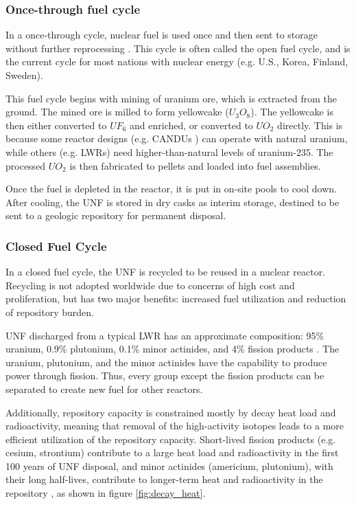 \subsubsection{Once-through fuel cycle}

In a once-through cycle, nuclear fuel is used once and then sent to
storage without further reprocessing \cite{tsoulfanidis_nuclear_2013}.
This cycle is often called the open fuel cycle, and is the current cycle for
most nations with nuclear energy (e.g. U.S., Korea, Finland, Sweden).

This fuel cycle begins with mining of uranium ore, which is extracted from the
ground. The mined ore is milled to form yellowcake ($U_3O_8$).
The yellowcake is then either converted to $UF_6$ and enriched, or converted
to $UO_2$ directly. This is because some reactor designs (e.g. \glspl{CANDU} \cite{torgerson_candu_2006})
can operate with natural uranium, while others (e.g. \glspl{LWR}) need
higher-than-natural levels of uranium-235. The processed $UO_2$ is
then fabricated to pellets and loaded into fuel assemblies.

Once the fuel is depleted in the reactor, it is put in on-site pools to cool down.
After cooling, the \gls{UNF}
is stored in dry casks as interim storage, destined to be sent to a geologic repository
for permanent disposal.

\subsubsection{Closed Fuel Cycle}
In a closed fuel cycle, the \gls{UNF} is recycled to be reused
in a nuclear reactor. Recycling is not adopted worldwide due to
concerns of high cost and proliferation, but has two major
benefits: increased fuel utilization and reduction of repository
burden.

\gls{UNF} discharged from a typical \gls{LWR} has an approximate
composition: 95\% uranium, 0.9\% plutonium, 0.1\%
minor actinides, and 4\% fission products \cite{feiveson_spent_2011}.
The uranium, plutonium, and the minor actinides have the capability
to produce power through fission. Thus, every group except the
fission products can be separated to create new fuel for other reactors.

Additionally, repository capacity is constrained mostly by decay heat
load and radioactivity, meaning that removal of the high-activity
isotopes leads to a more efficient utilization of the repository
capacity. Short-lived fission products (e.g. cesium, strontium) contribute
to a large heat load and radioactivity in the first 100 years of \gls{UNF} disposal,
and minor actinides (americium, plutonium), with their long half-lives,
contribute to longer-term heat and radioactivity in the repository \cite{wigeland_separations_2006},
as shown in figure \ref{fig:decay_heat}.


